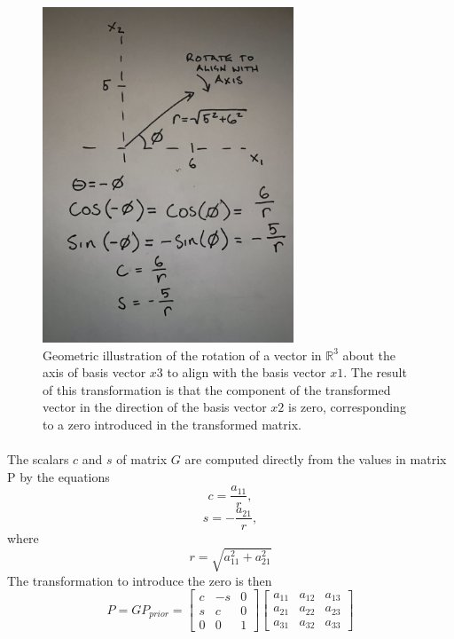 \documentclass{article}
\begin{document}
\begin{figure}
\centering
\includegraphics[width=75mm, angle=-90]{Givens1}
\caption{Geometric illustration of the rotation of a vector in $\mathbb{R}^3$ about the axis of basis vector ${x3}$ to align with the basis vector ${x1}$. The result of this transformation is that the component of the transformed vector in the direction of the basis vector $x2$ is zero, corresponding to a zero introduced in the transformed matrix.}
\label{GivensFig}
\end{figure}

\paragraph{}
The scalars $c$ and $s$ of matrix $G$ are computed directly from the values in matrix P by the equations 
\begin{equation}
c = \frac{a_{11}}{r}, 
\end{equation}
\begin{equation}
s = -\frac{a_{21}}{r}, 
\end{equation}
where
\begin{equation}
 r=\sqrt{a_{11}^2 + a_{21}^2}
\end{equation}
The transformation to introduce the zero is then
\begin{equation}
P = GP_{prior} =
\begin{bmatrix}
c & -s & 0\\
s & c & 0\\
0 & 0 & 1
\end{bmatrix}
\begin{bmatrix}
a_{11} & a_{12} & a_{13}\\
a_{21} & a_{22} & a_{23}\\
a_{31} & a_{32} & a_{33}
\end{bmatrix}
\end{equation}
\end{document}
